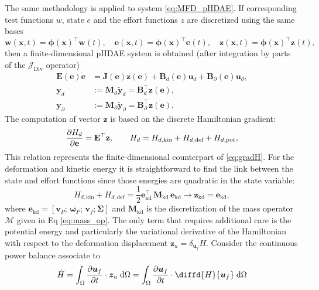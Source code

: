 \documentclass{svjour3}                     %
\DeclareMathOperator*{\Div}{Div}
\begin{document}
The same methodology is applied to system \eqref{eq:MFD_pHDAE}. If corresponding test functions $w$, state $e$ and the effort functions $z$ are discretized using the same bases
\[ \bm{w}(\bm{x}, t) = \bm{\phi}(\bm{x})^\top \mathbf{w}(t), \quad \bm{e}(\bm{x}, t) = \bm{\phi}(\bm{x})^\top \mathbf{e}(t), \quad \bm{z}(\bm{x}, t) = \bm{\phi}(\bm{x})^\top \mathbf{z}(t),
\]
then a finite-dimensional pHDAE system is obtained (after integration by parts of the $\mathcal{J}_{\Div}$ operator)
\begin{equation}
	\begin{aligned}
	\mathbf{E}(\mathbf{e}) \dot{\mathbf{e}} &= \mathbf{J}(\mathbf{e}) \mathbf{z}(\mathbf{e}) + \mathbf{B}_d(\mathbf{e}) \mathbf{u}_d + \mathbf{B}_\partial(\mathbf{e}) \mathbf{u}_\partial, \\
	\mathbf{y}_d &:= \mathbf{M}_d \widetilde{\mathbf{y}}_d = \mathbf{B}_d^\top \mathbf{z}(\mathbf{e}),  \\
	\mathbf{y}_\partial &:= \mathbf{M}_\partial \widetilde{\mathbf{y}}_\partial = \mathbf{B}_\partial^\top \mathbf{z}(\mathbf{e}).
	\end{aligned}
\end{equation}
The computation of vector $\mathbf{z}$ is based on the discrete Hamiltonian  gradient:
\[
\diffp{H_d}{\mathbf{e}} = \mathbf{E}^\top \mathbf{z}, \qquad H_d = H_{d, \text{kin}}+H_{d, \text{def}}+H_{d, \text{pot}},
\]
This relation represents the finite-dimensional counterpart of \eqref{eq:gradH}. For the deformation and kinetic energy it is straightforward to find the link between the state and effort functions since those energies are quadratic in the state variable:
\begin{equation}
H_{d, \text{kin}} + H_{d, \text{def}} = \frac{1}{2} \mathbf{e}_{\text{kd}}^\top \, \mathbf{M}_{\text{kd}} \, \mathbf{e}_{\text{kd}} \longrightarrow \mathbf{z}_{\text{kd}} = \mathbf{e}_{\text{kd}},
\end{equation}
where $\mathbf{e}_{\text{kd}} = [\mathbf{v}_P; \, \bm{\omega}_P; \, \mathbf{v}_f; \bm{\Sigma}]$ and $\mathbf{M}_{\text{kd}}$ is the discretization of the mass operator $\bm{\mathcal{M}}$ given in Eq \eqref{eq:mass_op}.
The only term that requires additional care is the potential energy and particularly the variational derivative of the Hamiltonian with respect to the deformation displacement $\bm{z}_{u}=\delta_{\bm{u}_f} H$.  Consider the continuous power balance associate to
\[
\dot{H} = \int_{\Omega} \diffp{\bm{u}_f}{t} \cdot \bm{z}_{u} \d{\Omega} = \int_{\Omega} \diffp{\bm{u}_f}{t} \cdot \diffd{H}{\bm{u}_f} \d{\Omega}
\]
\end{document}
